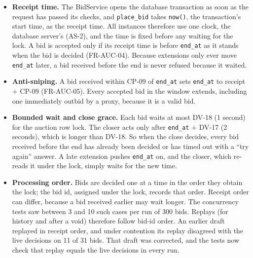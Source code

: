 \documentclass[11pt,a4paper]{article}
\begin{document}
\begin{itemize}[nosep]
  \item \textbf{Receipt time.} The BidService opens the database transaction as soon as the request has passed its checks, and \texttt{place\_bid} takes \texttt{now()}, the transaction's start time, as the receipt time. All instances therefore use one clock, the database server's (AS-2), and the time is fixed before any waiting for the lock. A bid is accepted only if its receipt time is before \texttt{end\_at} as it stands when the bid is decided (FR-AUC-04). Because extensions only ever move \texttt{end\_at} later, a bid received before the end is never refused because it waited.
  \item \textbf{Anti-sniping.} A bid received within CP-09 of \texttt{end\_at} sets \texttt{end\_at} to receipt $+$ CP-09 (FR-AUC-05). Every accepted bid in the window extends, including one immediately outbid by a proxy, because it is a valid bid.
  \item \textbf{Bounded wait and close grace.} Each bid waits at most DV-18 (1 second) for the auction row lock. The closer acts only after \texttt{end\_at} $+$ DV-17 (2 seconds), which is longer than DV-18. So when the close decides, every bid received before the end has already been decided or has timed out with a ``try again'' answer. A late extension pushes \texttt{end\_at} on, and the closer, which re-reads it under the lock, simply waits for the new time.
  \item \textbf{Processing order.} Bids are decided one at a time in the order they obtain the lock; the bid id, assigned under the lock, records that order. Receipt order can differ, because a bid received earlier may wait longer. The concurrency tests saw between 3 and 10 such cases per run of 300 bids. Replays (for history and after a void) therefore follow bid-id order. An earlier draft replayed in receipt order, and under contention its replay disagreed with the live decisions on 11 of 31 bids. That draft was corrected, and the tests now check that replay equals the live decisions in every run.
\end{itemize}
\end{document}
